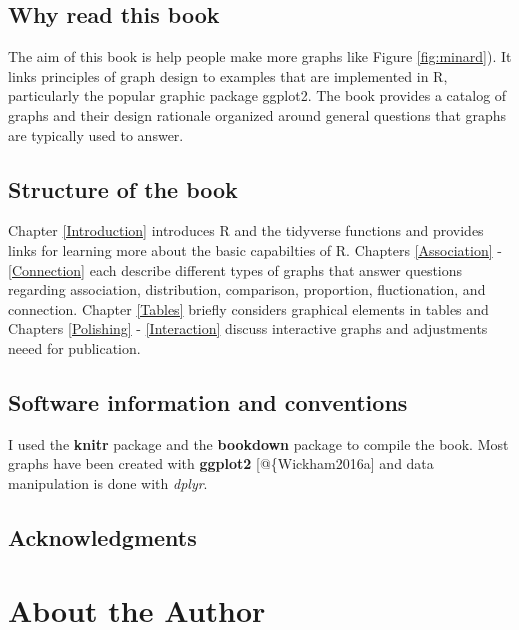 \documentclass[]{krantz}
\let\BeginKnitrBlock\begin \let\EndKnitrBlock\end
\begin{document}
\hypertarget{why-read-this-book}{%
\section*{Why read this book}\label{why-read-this-book}}


The aim of this book is help people make more graphs like Figure \ref{fig:minard}). It links principles of graph design to examples that are implemented in R, particularly the popular graphic package ggplot2. The book provides a catalog of graphs and their design rationale organized around general questions that graphs are typically used to answer.

\hypertarget{structure-of-the-book}{%
\section*{Structure of the book}\label{structure-of-the-book}}


Chapter \ref{Introduction} introduces R and the tidyverse functions and provides links for learning more about the basic capabilties of R. Chapters \ref{Association} - \ref{Connection} each describe different types of graphs that answer questions regarding association, distribution, comparison, proportion, fluctionation, and connection. Chapter \ref{Tables} briefly considers graphical elements in tables and Chapters \ref{Polishing} - \ref{Interaction} discuss interactive graphs and adjustments neeed for publication.

\hypertarget{software-information-and-conventions}{%
\section*{Software information and conventions}\label{software-information-and-conventions}}


I used the \textbf{knitr} package \citep{xie2015} and the \textbf{bookdown} package \citep{R-bookdown} to compile the book. Most graphs have been created with \textbf{ggplot2} {[}@\{Wickham2016a{]} and data manipulation is done with \emph{dplyr}.

\hypertarget{acknowledgments}{%
\section*{Acknowledgments}\label{acknowledgments}}


\BeginKnitrBlock{flushright}
\EndKnitrBlock{flushright}

\hypertarget{about-the-author}{%
\chapter*{About the Author}\label{about-the-author}}
\end{document}
